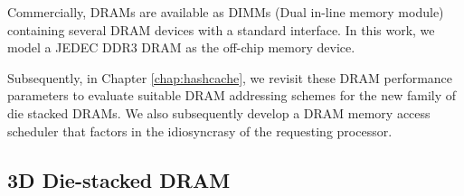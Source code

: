 \par Commercially, DRAMs are available as DIMMs (Dual in-line memory module) containing several DRAM devices with a standard interface. In this work, we model a JEDEC DDR3 DRAM \cite{jedec-ddr3} as the off-chip memory device.
\par Subsequently, in Chapter \ref{chap:hashcache}, we revisit these DRAM performance parameters to evaluate suitable DRAM addressing schemes for the new family of die stacked DRAMs. We also subsequently develop a DRAM memory access scheduler that factors in the idiosyncrasy of the requesting processor.

\subsection{3D Die-stacked DRAM} \label{stacked-dram-intro}

